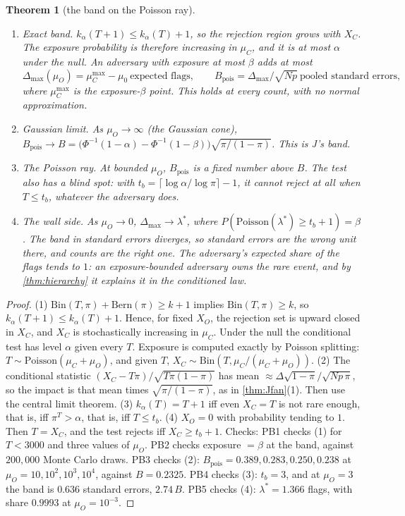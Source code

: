 \documentclass[11pt]{article}
\newtheorem{theorem}{Theorem}\newtheorem{proposition}[theorem]{Proposition}\newtheorem{lemma}[theorem]{Lemma}\newtheorem{corollary}[theorem]{Corollary}\newtheorem{conjecture}[theorem]{Conjecture}
\theoremstyle{definition}\newtheorem{definition}[theorem]{Definition}\newtheorem{remark}[theorem]{Remark}\newtheorem{example}[theorem]{Example}
\begin{document}
\begin{theorem}[the band on the Poisson ray]\label{thm:poissonband}
\begin{enumerate}
\item[(1)] \emph{Exact band.} $k_\alpha(T+1)\le k_\alpha(T)+1$, so the rejection region grows with $X_C$. The exposure probability is therefore increasing in
  $\mu_C$, and it is at most $\alpha$ under the null. An adversary with exposure at most $\beta$ adds at most
  \[
  \Delta_{\max}(\mu_O)=\mu_C^{\max}-\mu_0\ \text{expected flags},\qquad B_{\mathrm{pois}}=\Delta_{\max}/\sqrt{Np}\ \text{pooled standard errors},
  \]
  where $\mu_C^{\max}$ is the exposure-$\beta$ point. This holds at every count, with no normal approximation.
\item[(2)] \emph{Gaussian limit.} As $\mu_O\to\infty$ (the Gaussian cone), $B_{\mathrm{pois}}\to B=\bigl(\Phi^{-1}(1-\alpha)-\Phi^{-1}(1-\beta)\bigr)\sqrt{\pi/(1-\pi)}$. This is J's band.
\item[(3)] \emph{The Poisson ray.} At bounded $\mu_O$, $B_{\mathrm{pois}}$ is a fixed number above $B$. The test also has a \emph{blind spot}: with
  $t_b=\lceil\log\alpha/\log\pi\rceil-1$, it cannot reject at all when $T\le t_b$, whatever the adversary does.
\item[(4)] \emph{The wall side.} As $\mu_O\to0$, $\Delta_{\max}\to\lambda^*$, where $P(\mathrm{Poisson}(\lambda^*)\ge t_b+1)=\beta$. The band in standard errors diverges,
  so standard errors are the wrong unit there, and counts are the right one. The adversary's expected share of the flags tends to $1$: an
  exposure-bounded adversary \emph{owns} the rare event, and by \cref{thm:hierarchy} it explains it in the conditioned law.
\end{enumerate}
\end{theorem}

\begin{proof}
(1) $\mathrm{Bin}(T,\pi)+\mathrm{Bern}(\pi)\ge k+1$ implies $\mathrm{Bin}(T,\pi)\ge k$, so $k_\alpha(T+1)\le k_\alpha(T)+1$. Hence, for fixed $X_O$, the rejection set is
upward closed in $X_C$, and $X_C$ is stochastically increasing in $\mu_C$. Under the null the conditional test has level $\alpha$ given every $T$.
Exposure is computed exactly by Poisson splitting: $T\sim\mathrm{Poisson}(\mu_C+\mu_O)$, and given $T$, $X_C\sim\mathrm{Bin}(T,\mu_C/(\mu_C+\mu_O))$.
(2) The conditional statistic $(X_C-T\pi)/\sqrt{T\pi(1-\pi)}$ has mean $\approx\Delta\sqrt{1-\pi}/\sqrt{Np\,\pi}$, so the impact is that mean times
$\sqrt{\pi/(1-\pi)}$, as in \cref{thm:Jfan}(1). Then use the central limit theorem.
(3) $k_\alpha(T)=T+1$ iff even $X_C=T$ is not rare enough, that is, iff $\pi^T>\alpha$, that is, iff $T\le t_b$.
(4) $X_O=0$ with probability tending to $1$. Then $T=X_C$, and the test rejects iff $X_C\ge t_b+1$.
Checks: PB1 checks (1) for $T<3000$ and three values of $\mu_O$. PB2 checks exposure $=\beta$ at the band, against $200{,}000$ Monte Carlo draws.
PB3 checks (2): $B_{\mathrm{pois}}=0.389,0.283,0.250,0.238$ at $\mu_O=10,10^2,10^3,10^4$, against $B=0.2325$. PB4 checks (3): $t_b=3$, and at $\mu_O=3$ the band is
$0.636$ standard errors, $2.74\,B$. PB5 checks (4): $\lambda^*=1.366$ flags, with share $0.9993$ at $\mu_O=10^{-3}$.
\end{proof}
\end{document}
